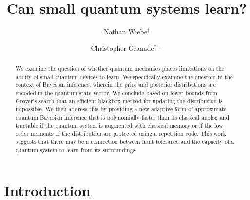\documentclass[aps,amsmath,onecolumn,amssymb,notitlepage]{revtex4-1}
\begin{document}
\newcommand{\id}{\openone}


\title{Can small quantum systems learn?}
\author{Nathan Wiebe$^\dagger$}
\author{Christopher Granade$^{*+}$}
\begin{abstract}
We examine the question of whether quantum mechanics places limitations on the ability of small quantum devices to learn.  We specifically examine the question in the context of Bayesian inference, wherein the prior and posterior distributions are encoded in the quantum state vector.  We conclude based on lower bounds from Grover's search that an efficient blackbox method for updating the distribution is impossible.  We then address this by providing a new adaptive form of approximate quantum Bayesian inference that is polynomially faster than its classical anolog and tractable if the quantum system is augmented with classical memory or if the low--order moments of the distribution are protected using a repetition code.  This work suggests that there may be a connection between fault tolerance and the capacity of a quantum system to learn from its surroundings.
\end{abstract}
\maketitle
\section{Introduction}
\end{document}

